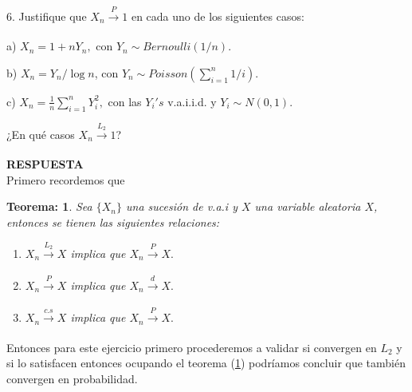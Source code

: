 \documentclass[11pt,letterpaper]{article}
\newcommand{\res}{\textbf{RESPUESTA}\\}
\newtheorem{thmt}{Teorema:}
\newcommand{\s}{\sum_{i=1}^n}
\begin{document}
6. Justifique que $X_n\xrightarrow[]{P} 1$ en cada uno de los siguientes casos:

a) $X_n=1+nY_n,$ con $Y_n\sim Bernoulli(1/n)$.

b) $X_n=Y_n/\log n$, con $Y_n\sim Poisson\left(\sum_{i=1}^n 1/i \right).$

c) $X_n=\frac{1}{n}\s Y_i^2,$ con las $Y_i's$ v.a.i.i.d. y $Y_i\sim N(0,1)$. 

¿En qué casos $X_n\xrightarrow[]{L_2} 1 $?

\res Primero recordemos que
\begin{framed}
    \begin{thmt} \label{relaciones}
	Sea $\{X_n\}$ una sucesión de v.a.i y $X$ una variable aleatoria $X$, entonces se tienen las siguientes relaciones:
	\begin{enumerate}
	\item[a)] $X_n\xrightarrow[]{L_2} X$ implica que  $X_n\xrightarrow[]{P} X.$
	
	\item[b)] $X_n\xrightarrow[]{P} X$ implica que  $X_n\xrightarrow[]{d} X.$
	
	\item[c)] $X_n\xrightarrow[]{c.s} X$ implica que  $X_n\xrightarrow[]{P} X.$
	\end{enumerate}
    \end{thmt}
\end{framed}
Entonces para este ejercicio primero procederemos a validar si convergen en $L_2$ y si lo satisfacen entonces ocupando el teorema (\ref{relaciones}) podríamos concluir que también convergen en probabilidad.
\end{document}
